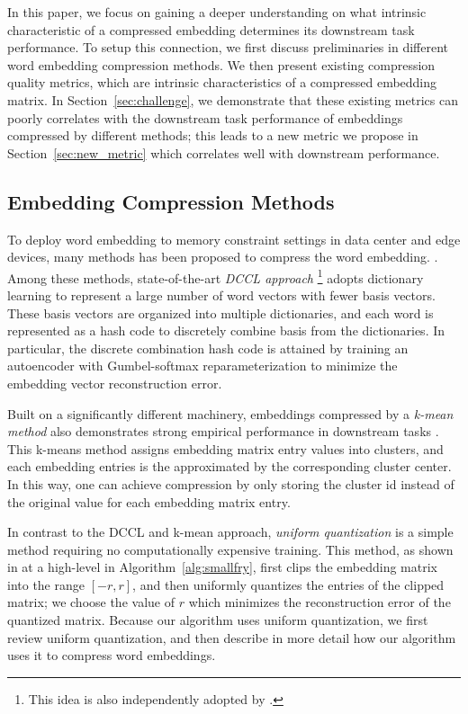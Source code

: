 In this paper, we focus on gaining a deeper understanding on what intrinsic characteristic of a compressed embedding determines its downstream task performance. To setup this connection, we first discuss preliminaries in different word embedding compression methods. We then present existing compression quality metrics, which are intrinsic characteristics of a compressed embedding matrix. In Section~\ref{sec:challenge}, we demonstrate that these existing metrics can poorly correlates with the downstream task performance of embeddings compressed by different methods; this leads to a new metric we propose in Section~\ref{sec:new_metric} which correlates well with downstream performance.
\subsection{Embedding Compression Methods}
\label{subsec:prel}
To deploy word embedding to memory constraint settings in data center and edge devices, many methods has been proposed to compress the word embedding. . Among these methods, state-of-the-art \emph{DCCL approach} \citep{dccl17}\footnote{This idea is also independently adopted by \citet{kway18}.} adopts dictionary learning to represent a large number of word vectors with fewer basis vectors. These basis vectors are organized into multiple dictionaries, and each word is represented as a hash code to discretely combine basis from the dictionaries. In particular, the discrete combination hash code is attained by training an autoencoder with Gumbel-softmax reparameterization \citep{maddison2016concrete,jang2016categorical} to minimize the embedding vector reconstruction error. 

Built on a significantly different machinery, embeddings compressed by a \emph{k-mean method} also demonstrates strong empirical performance in downstream tasks \citep{andrews16}. This k-means method assigns embedding matrix entry values into clusters, and each embedding entries is the approximated by the corresponding cluster center. In this way, one can achieve compression by only storing the cluster id instead of the original value for each embedding matrix entry. 

In contrast to the DCCL and k-mean approach, \emph{uniform quantization} is a simple method requiring no computationally expensive training. This method, as shown in at a high-level in Algorithm~\ref{alg:smallfry}, first clips the embedding matrix into the range $[-r,r]$, and then uniformly quantizes the entries of the clipped matrix; we choose the value of $r$ which minimizes the reconstruction error of the quantized matrix.
Because our algorithm uses uniform quantization, we first review uniform quantization, and then describe in more detail how our algorithm uses it to compress word embeddings.


